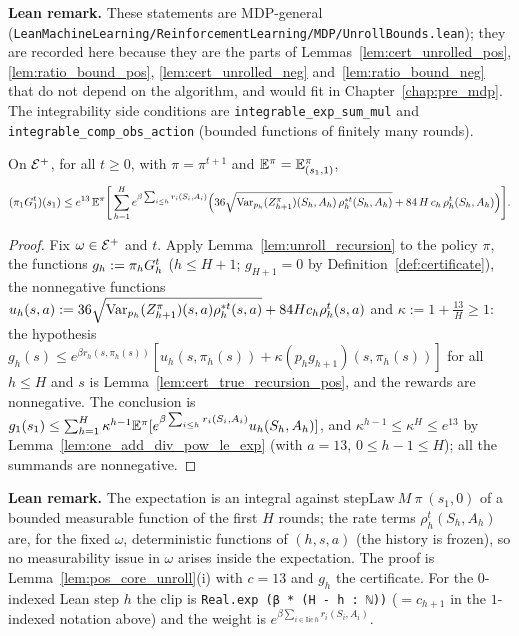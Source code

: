 \textbf{Lean remark.} These statements are MDP-general
(\texttt{LeanMachineLearning/ReinforcementLearning/MDP/UnrollBounds.lean}); they are recorded here
because they are the parts of Lemmas~\ref{lem:cert_unrolled_pos}, \ref{lem:ratio_bound_pos},
\ref{lem:cert_unrolled_neg} and~\ref{lem:ratio_bound_neg} that do not depend on the algorithm, and
would fit in Chapter~\ref{chap:pre_mdp}. The integrability side conditions are
\texttt{integrable\_exp\_sum\_mul} and \texttt{integrable\_comp\_obs\_action} (bounded functions of finitely
many rounds).

\begin{lemma}\label{lem:cert_unrolled_pos}
\leanok
{}
On $\mathcal{E}^+$, for all $t \ge 0$, with $\pi = \pi^{t+1}$ and $\mathbb{E}^\pi = \mathbb{E}^\pi_{(s_1, 1)}$,
\[
  (\pi_1G_1^t)(s_1) \le e^{13}\,\mathbb{E}^\pi\Bigg[\sum_{h=1}^H e^{\beta\sum_{i \le h} r_i(S_i, A_i)}
  \Big(36\sqrt{\operatorname{Var}_{p_h}(Z^\pi_{h+1})(S_h, A_h)\,\rho^{*t}_h(S_h, A_h)}
  + 84\,H\,c_h\,\rho^t_h(S_h, A_h)\Big)\Bigg] .
\]
\end{lemma}

\begin{proof}
\leanok
Fix $\omega \in \mathcal{E}^+$ and $t$. Apply Lemma~\ref{lem:unroll_recursion} to the policy $\pi$, the
functions $g_h := \pi_hG_h^t$ ($h \le H + 1$; $g_{H+1} = 0$ by Definition~\ref{def:certificate}), the
nonnegative functions
$u_h(s,a) := 36\sqrt{\operatorname{Var}_{p_h}(Z^\pi_{h+1})(s,a)\rho^{*t}_h(s,a)} + 84Hc_h\rho^t_h(s,a)$ and
$\kappa := 1 + \frac{13}{H} \ge 1$: the hypothesis
$g_h(s) \le e^{\beta r_h(s, \pi_h(s))}[u_h(s, \pi_h(s)) + \kappa(p_hg_{h+1})(s, \pi_h(s))]$ for all
$h \le H$ and $s$ is Lemma~\ref{lem:cert_true_recursion_pos}, and the rewards are nonnegative. The
conclusion is $g_1(s_1) \le \sum_{h=1}^H\kappa^{h-1}\mathbb{E}^\pi[e^{\beta\sum_{i \le h} r_i(S_i,A_i)}u_h(S_h,A_h)]$, and
$\kappa^{h-1} \le \kappa^H \le e^{13}$ by Lemma~\ref{lem:one_add_div_pow_le_exp} (with $a = 13$,
$0 \le h - 1 \le H$); all the summands are nonnegative.
\end{proof}

\textbf{Lean remark.} The expectation is an integral against
$\mathrm{stepLaw}\ M\ \pi\ (s_1, 0)$ of a bounded measurable function of the first $H$ rounds;
the rate terms $\rho^t_h(S_h, A_h)$ are, for the fixed $\omega$, deterministic functions of $(h, s, a)$
(the history is frozen), so no measurability issue in $\omega$ arises inside the expectation.
The proof is Lemma~\ref{lem:pos_core_unroll}(i) with $c = 13$ and $g_h$ the certificate. For the
$0$-indexed Lean step $h$ the clip is \texttt{Real.exp (β * (H - h : ℕ))} ($= c_{h+1}$ in the
$1$-indexed notation above) and the weight is $e^{\beta\sum_{i \in \mathrm{Iic}\,h} r_i(S_i, A_i)}$.

